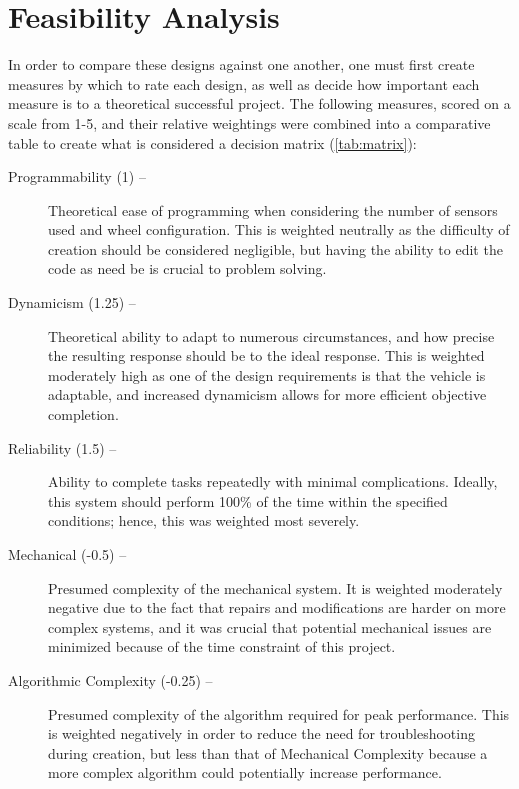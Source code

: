 \documentclass[11pt]{report}
\begin{document}
\newpage
\section{Feasibility Analysis}\label{DecisionMatrix}
In order to compare these designs against one another, one must first create measures by which to rate each design, as well as decide how important each measure is to a theoretical successful project. The following measures, scored on a scale from 1-5, and their relative weightings were combined into a comparative table to create what is considered a decision matrix (\cref{tab:matrix}):
\begin{adjustwidth}{0.5cm}{0cm}
\vspace{1em}
\begin{description}
    \item[Programmability (1) --]Theoretical ease of programming when considering the number of sensors used and wheel configuration. This is weighted neutrally as the difficulty of creation should be considered negligible, but having the ability to edit the code as need be is crucial to problem solving.\vspace{1em}
    \item[Dynamicism (1.25) --]Theoretical ability to adapt to numerous circumstances, and how precise the resulting response should be to the ideal response. This is weighted moderately high as one of the design requirements is that the vehicle is adaptable, and increased dynamicism allows for more efficient objective completion.\vspace{1em}
    \item[Reliability (1.5) --]Ability to complete tasks repeatedly with minimal complications. Ideally, this system should perform 100\% of the time within the specified conditions; hence, this was weighted most severely.\vspace{1em}
    \item[Mechanical (-0.5) --]Presumed complexity of the mechanical system. It is weighted moderately negative due to the fact that repairs and modifications are harder on more complex systems, and it was crucial that potential mechanical issues are minimized because of the time constraint of this project.\vspace{1em}
    \item[Algorithmic Complexity (-0.25) --]Presumed complexity of the algorithm required for peak performance. This is weighted negatively in order to reduce the need for troubleshooting during creation, but less than that of Mechanical Complexity because a more complex algorithm could potentially increase performance.
\end{description}
\end{adjustwidth}
\end{document}
